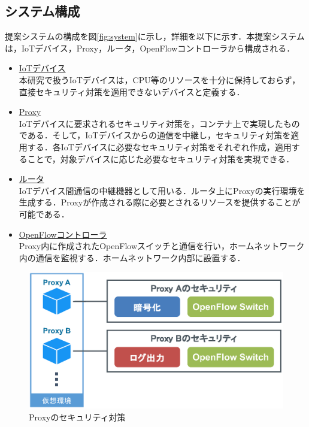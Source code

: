 \documentclass[a4paper,10pt,twocolumn,uplatex]{jsarticle}
\begin{document}
\subsection{システム構成}
提案システムの構成を図\ref{fig:system}に示し，詳細を以下に示す．本提案システムは，IoTデバイス，Proxy，ルータ，OpenFlowコントローラから構成される．
\begin{itemize}
  \item \underline{IoTデバイス}\mbox{}\\
        本研究で扱うIoTデバイスは，CPU等のリソースを十分に保持しておらず，直接セキュリティ対策を適用できないデバイスと定義する．
  \item \underline{Proxy}\mbox{}\\
        IoTデバイスに要求されるセキュリティ対策を，コンテナ上で実現したものである．そして，IoTデバイスからの通信を中継し，セキュリティ対策を適用する．各IoTデバイスに必要なセキュリティ対策をそれぞれ作成，適用することで，対象デバイスに応じた必要なセキュリティ対策を実現できる．
  \item \underline{ルータ}\mbox{}\\
        IoTデバイス間通信の中継機器として用いる．ルータ上にProxyの実行環境を生成する．Proxyが作成される際に必要とされるリソースを提供することが可能である．
  \item \underline{OpenFlowコントローラ}\mbox{}\\
        Proxy内に作成されたOpenFlowスイッチと通信を行い，ホームネットワーク内の通信を監視する．ホームネットワーク内部に設置する．
\end{itemize}

\begin{figure}[!tb]
  \centering
  \includegraphics[width=\linewidth]{img/security.eps}
  \caption{Proxyのセキュリティ対策}
  \label{fig:security}
\end{figure}
\end{document}
